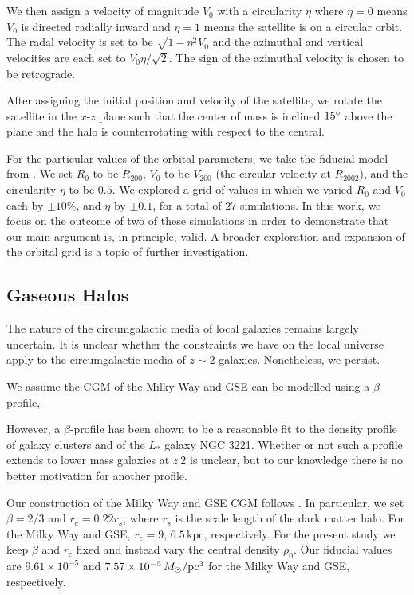 We then assign a velocity of magnitude $V_0$ with a circularity $\eta$ where $\eta=0$ means $V_0$ is directed radially inward and $\eta=1$ means the satellite is on a circular orbit. The radal velocity is set to be $\sqrt{1-\eta^2}V_0$ and the azimuthal and vertical velocities are each set to $V_0 \eta / \sqrt{2}$. The sign of the azimuthal velocity is chosen to be retrograde.

After assigning the initial position and velocity of the satellite, we rotate the satellite in the $x$-$z$ plane such that the center of mass is inclined $15\degree$ above the plane and the halo is counterrotating with respect to the central.

For the particular values of the orbital parameters, we take the fiducial model from \citet{2021ApJ...923...92N}. We set $R_0$ to be $R_{200}$, $V_0$ to be $V_{200}$ (the circular velocity at $R_{2002}$), and the circularity $\eta$ to be $0.5$. We explored a grid of values in which we varied $R_0$ and $V_0$ each by $\pm10\%$, and $\eta$ by $\pm0.1$, for a total of $27$ simulations. In this work, we focus on the outcome of two of these simulations in order to demonstrate that our main argument is, in principle, valid. A broader exploration and expansion of the orbital grid is a topic of further investigation.

\subsection{Gaseous Halos}\label{ssec:gashalo}

The nature of the circumgalactic media of local galaxies remains largely
uncertain. It is unclear whether the constraints we have on the local universe
apply to the circumgalactic media of $z\sim2$ galaxies. Nonetheless, we persist.

We assume the CGM of the Milky Way and GSE can be modelled using a $\beta$ profile,

However, a $\beta$-profile has been shown to be a reasonable fit to the density
profile of galaxy clusters and of the $L_{*}$ galaxy NGC 3221. Whether or not
such a profile extends to lower mass galaxies at $z~2$ is unclear, but to our
knowledge there is no better motivation for another profile.

Our construction of the Milky Way and GSE CGM follows
\citet{2023MNRAS.tmp.2070B}. In particular, we set $\beta=2/3$ and $r_c=0.22
r_s$, where $r_s$ is the scale length of the dark matter halo. For the Milky Way
and GSE, $r_c=9$, $6.5\,\textrm{kpc}$, respectively. For the present study we
keep $\beta$ and $r_c$ fixed and instead vary the central density $\rho_0$. Our
fiducial values are $9.61\times10^{-5}$ and $7.57\times10^{-5}\,M_{\odot}/\textrm{pc}^3$ for
the Milky Way and GSE, respectively.

